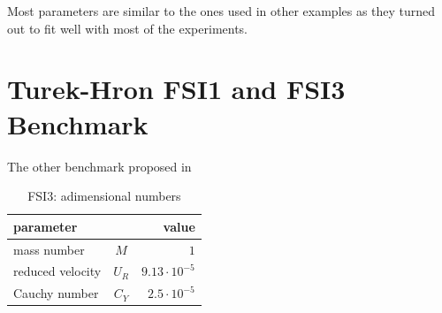 Most parameters are similar to the ones used in other examples as they turned out to fit well with most of the experiments. 














































\section{Turek-Hron FSI1 and FSI3 Benchmark}
\label{sec:FSI1-FSI3}

The other benchmark proposed in \cite{turek2006proposal}



\begin{table}[!htb]
	\begin{center}
		\begin{tabular}{ l c | r } 
			parameter & & value   \\ 
			\hline
			mass number  & $M$ & $1$     \\
			reduced velocity & $U_R$ & $9.13\cdot 10^{-5}$  \\
			Cauchy number  & $C_Y$ & $2.5\cdot 10^{-5}$  \\			
		\end{tabular}
	\end{center}
	\caption{FSI3: adimensional numbers}
	\label{fsi3:ex1-adim}
\end{table}























